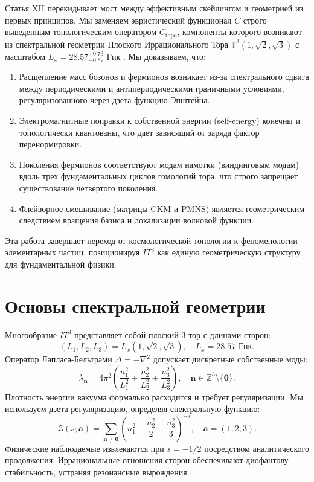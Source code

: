 \documentclass[12pt,a4paper]{article}
\begin{document}
Статья XII перекидывает мост между эффективным скейлингом и геометрией из первых принципов. Мы заменяем эвристический функционал $C$ строго выведенным топологическим оператором $C_{\text{topo}}$, компоненты которого возникают из спектральной геометрии Плоского Иррационального Тора $\mathbb{T}^3(1,\sqrt{2},\sqrt{3})$ с масштабом $L_x = 28.57^{+0.73}_{-0.87}$ Гпк \cite{PaperI}. Мы доказываем, что:
\begin{enumerate}
    \item Расщепление масс бозонов и фермионов возникает из-за спектрального сдвига между периодическими и антипериодическими граничными условиями, регуляризованного через дзета-функцию Эпштейна.
    \item Электромагнитные поправки к собственной энергии (self-energy) конечны и топологически квантованы, что дает зависящий от заряда фактор перенормировки.
    \item Поколения фермионов соответствуют модам намотки (виндинговым модам) вдоль трех фундаментальных циклов гомологий тора, что строго запрещает существование четвертого поколения.
    \item Флейворное смешивание (матрицы CKM и PMNS) является геометрическим следствием вращения базиса и локализации волновой функции.
\end{enumerate}
Эта работа завершает переход от космологической топологии к феноменологии элементарных частиц, позиционируя $IT^3$ как единую геометрическую структуру для фундаментальной физики.

\section{Основы спектральной геометрии}
Многообразие $IT^3$ представляет собой плоский 3-тор с длинами сторон:
\begin{equation}
    (L_1, L_2, L_3) = L_x (1, \sqrt{2}, \sqrt{3}), \quad L_x = 28.57 \text{ Гпк}.
\end{equation}
Оператор Лапласа-Бельтрами $\Delta = -\nabla^2$ допускает дискретные собственные моды:
\begin{equation}
    \lambda_{\mathbf{n}} = 4\pi^2 \left( \frac{n_1^2}{L_1^2} + \frac{n_2^2}{L_2^2} + \frac{n_3^2}{L_3^2} \right), \quad \mathbf{n} \in \mathbb{Z}^3 \setminus \{\mathbf{0}\}.
\end{equation}
Плотность энергии вакуума формально расходится и требует регуляризации. Мы используем дзета-регуляризацию, определяя спектральную функцию:
\begin{equation}
    \mathcal{Z}(s; \mathbf{a}) = \sum_{\mathbf{n} \neq \mathbf{0}} \left( n_1^2 + \frac{n_2^2}{2} + \frac{n_3^2}{3} \right)^{-s}, \quad \mathbf{a} = (1,2,3).
\end{equation}
Физические наблюдаемые извлекаются при $s = -1/2$ посредством аналитического продолжения. Иррациональные отношения сторон обеспечивают диофантову стабильность, устраняя резонансные вырождения \cite{Lutken1986}.
\end{document}
